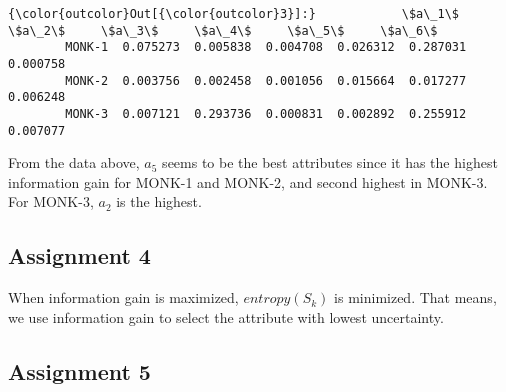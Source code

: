 \documentclass[11pt]{article}
\begin{document}
\begin{Verbatim}[commandchars=\\\{\}]
{\color{outcolor}Out[{\color{outcolor}3}]:}            \$a\_1\$     \$a\_2\$     \$a\_3\$     \$a\_4\$     \$a\_5\$     \$a\_6\$
        MONK-1  0.075273  0.005838  0.004708  0.026312  0.287031  0.000758
        MONK-2  0.003756  0.002458  0.001056  0.015664  0.017277  0.006248
        MONK-3  0.007121  0.293736  0.000831  0.002892  0.255912  0.007077
\end{Verbatim}
            
    From the data above, \(a_5\) seems to be the best attributes since it
has the highest information gain for MONK-1 and MONK-2, and second
highest in MONK-3. For MONK-3, \(a_2\) is the highest.

    \hypertarget{assignment-4}{%
\subsection{Assignment 4}\label{assignment-4}}

    When information gain is maximized, \(entropy(S_k)\) is minimized. That
means, we use information gain to select the attribute with lowest
uncertainty.

    \hypertarget{assignment-5}{%
\subsection{Assignment 5}\label{assignment-5}}
\end{document}
